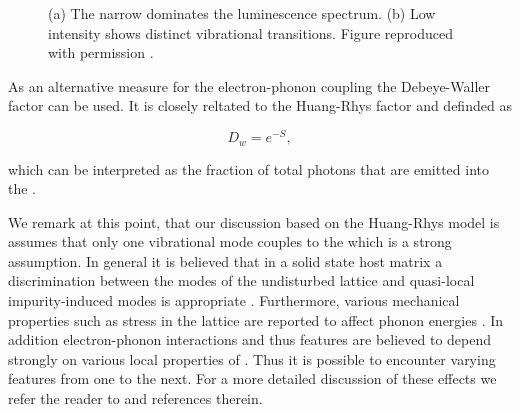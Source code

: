 \begin{figure}[thbp]
\begin{subfigure}[t]{ 0.49\linewidth}
 			\caption{}
 		\end{subfigure}
 		\caption[Flourescence spectra of \sivs at room temperature]{(a) The narrow \zpl dominates the luminescence spectrum. (b) Low intensity \psb shows distinct vibrational transitions. Figure reproduced with permission \cite{janine::thesis}.}
 		\label{fig::spectral_features}
 	\end{figure}


   As an alternative measure for the electron-phonon coupling the Debeye-Waller factor can be used. It is closely reltated to the Huang-Rhys factor and definded as

   \begin{equation}
     D_w = e^{-S},
   \end{equation}

    which can be interpreted as the fraction of total photons that are emitted into the \zpl.

    We remark at this point, that our discussion based on the Huang-Rhys model is assumes that only one vibrational mode couples to the \cc which is a strong assumption. In general it is believed that in a solid state host matrix a discrimination between the modes of the undisturbed lattice and quasi-local impurity-induced modes is appropriate \cite{neu::25, neu::139, neu::147}. Furthermore, various mechanical properties such as stress in the lattice are reported to affect phonon energies \cite{neu::149}. In addition electron-phonon interactions and thus \psb features are believed to depend strongly on various local properties of \ccs \cite{neu::111, neu::12}. Thus it is possible to encounter varying \psb features from one \siv to the next. For a more detailed discussion of these effects we refer the reader to \cite{neu::thesis, janine::thesis} and references therein.

